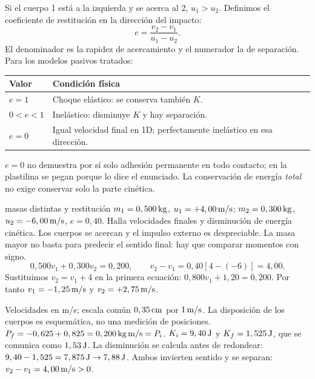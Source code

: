 \documentclass[11pt,a4paper]{article}
\begin{document}
Si el cuerpo 1 est\'a a la izquierda y se acerca al 2, $u_1>u_2$.
Definimos el coeficiente de restituci\'on en la direcci\'on del impacto:
\[
e=\frac{v_2-v_1}{u_1-u_2}.
\]
El denominador es la rapidez de acercamiento y el numerador la de separaci\'on.
Para los modelos pasivos tratados:
\begin{tabularx}{\linewidth}{@{}p{2.2cm}Y@{}}
\toprule
Valor & Condici\'on f\'isica\\
\midrule
$e=1$ & Choque el\'astico: se conserva tambi\'en $K$.\\
$0<e<1$ & Inel\'astico: disminuye $K$ y hay separaci\'on.\\
$e=0$ & Igual velocidad final en 1D; perfectamente inel\'astico en esa direcci\'on.\\
\bottomrule
\end{tabularx}
$e=0$ no demuestra por s\'i solo adhesi\'on permanente en todo contacto;
en la plastilina se pegan porque lo dice el enunciado.
La conservaci\'on de energ\'ia \emph{total} no exige conservar solo la parte cin\'etica.

\begin{examplebox}{masas distintas y restituci\'on}
 $m_1=0,500\,\mathrm{kg}$, $u_1=+4,00\,\mathrm{m/s}$;
$m_2=0,300\,\mathrm{kg}$, $u_2=-6,00\,\mathrm{m/s}$, $e=0,40$.
Halla velocidades finales y disminuci\'on de energ\'ia cin\'etica.
\solutionblock
{} Los cuerpos se acercan y el impulso externo es despreciable.
La masa mayor no basta para predecir el sentido final:
hay que comparar momentos con signo.
\[
0,500v_1+0,300v_2=0,200,\qquad
v_2-v_1=0,40[4-(-6)]=4,00.
\]
 Sustituimos $v_2=v_1+4$ en la primera ecuaci\'on:
$0,800v_1+1,20=0,200$.
Por tanto $v_1=-1,25\,\mathrm{m/s}$ y $v_2=+2,75\,\mathrm{m/s}$.
\begin{center}
\end{center}
Velocidades en m/s; escala com\'un $0,35\,\mathrm{cm}$ por $1\,\mathrm{m/s}$.
La disposici\'on de los cuerpos es esquem\'atica, no una medici\'on de posiciones.
$P_f=-0,625+0,825=0,200\,\mathrm{kg\,m/s}=P_i$.
$K_i=9,40\,\mathrm{J}$ y $K_f=1,525\,\mathrm{J}$, que se comunica como $1,53\,\mathrm{J}$.
La disminuci\'on se calcula antes de redondear:
$9,40-1,525=7,875\,\mathrm{J}\to7,88\,\mathrm{J}$.
 Ambos invierten sentido y se separan:
$v_2-v_1=4,00\,\mathrm{m/s}>0$.
\end{examplebox}
\end{document}
